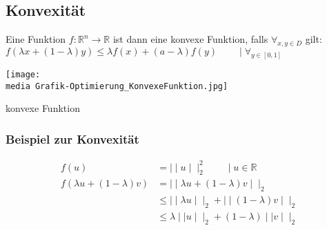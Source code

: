 \subsection{Konvexität}

\begin{Def}
Eine Funktion $f: \mathbb{R}^n\rightarrow\mathbb{R}$ ist dann eine konvexe Funktion, falls $\forall_{x,y\in D}$ gilt: 
$f(\lambda x+ (1 - \lambda)y) \leq \lambda f(x)+(a-\lambda)f(y) \qquad \mid \forall_{y\in[0,1]}$

\begin{dsafigure}
\begin{center}
\texttt{[image: \\media Grafik-Optimierung\_KonvexeFunktion.jpg]}
\caption{konvexe Funktion}
\end{center}
\end{dsafigure}

\end{Def}

\subsubsection{Beispiel zur Konvexität}

\begin{align*}
f(u) &=\mid\mid u\mid\mid_2^2\qquad\mid u\in\mathbb{R}\\
f(\lambda u+(1-\lambda)v) &=\mid\mid\lambda u+(1-\lambda)v\mid\mid_2 \\
&\leq\mid\mid\lambda u\mid\mid_2+\mid\mid(1-\lambda)v\mid\mid_2 \\
&\leq\lambda\mid\mid u\mid\mid_2+(1-\lambda)\mid\mid v\mid\mid_2
\end{align*}